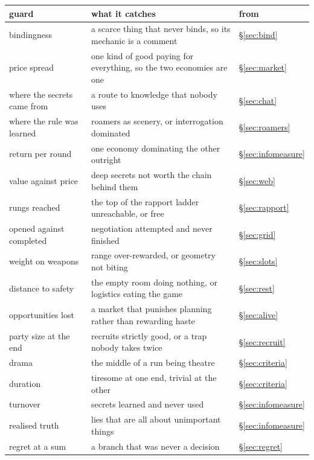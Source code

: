 \documentclass[11pt,a4paper]{article}
\begin{document}
\small
\begin{center}
\begin{tabular}{@{}l@{\hspace{3mm}}>{\raggedright\arraybackslash}p{}@{\hspace{3mm}}>{\raggedright\arraybackslash}p{}@{}}
\toprule
\textbf{guard} & \textbf{what it catches} & \textbf{from} \\
\midrule
bindingness      & a scarce thing that never binds, so its mechanic is a comment & \S\ref{sec:bind} \\
price spread     & one kind of good paying for everything, so the two economies are one & \S\ref{sec:market} \\
where the secrets came from & a route to knowledge that nobody uses & \S\ref{sec:chat} \\
where the rule was learned & roamers as scenery, or interrogation dominated & \S\ref{sec:roamers} \\
return per round & one economy dominating the other outright & \S\ref{sec:infomeasure} \\
value against price & deep secrets not worth the chain behind them & \S\ref{sec:web} \\
rungs reached    & the top of the rapport ladder unreachable, or free & \S\ref{sec:rapport} \\
opened against completed & negotiation attempted and never finished & \S\ref{sec:grid} \\
weight on weapons & range over-rewarded, or geometry not biting & \S\ref{sec:slots} \\
distance to safety & the empty room doing nothing, or logistics eating the game & \S\ref{sec:rest} \\
opportunities lost & a market that punishes planning rather than rewarding haste & \S\ref{sec:alive} \\
party size at the end & recruits strictly good, or a trap nobody takes twice & \S\ref{sec:recruit} \\
drama            & the middle of a run being theatre & \S\ref{sec:criteria} \\
duration         & tiresome at one end, trivial at the other & \S\ref{sec:criteria} \\
turnover         & secrets learned and never used & \S\ref{sec:infomeasure} \\
realised truth   & lies that are all about unimportant things & \S\ref{sec:infomeasure} \\
regret at a sum  & a branch that was never a decision & \S\ref{sec:regret} \\
\bottomrule
\end{tabular}
\end{center}
\normalsize
\end{document}
